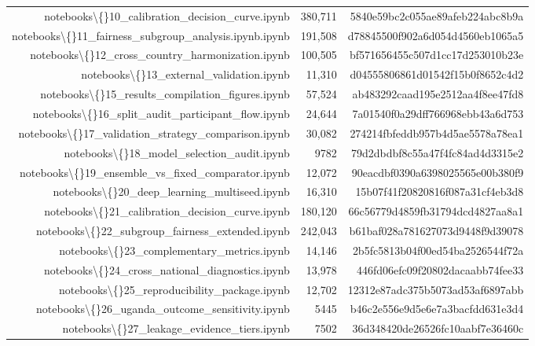 \documentclass[10pt]{article}
\begin{document}
\begin{longtable}{rrr}
notebooks\textbackslash\{\}10\_calibration\_decision\_curve.ipynb & 380{,}711 & 5840e59bc2c055ae89afeb224abc8b9a \\
notebooks\textbackslash\{\}11\_fairness\_subgroup\_analysis.ipynb.ipynb & 191{,}508 & d78845500f902a6d054d4560eb1065a5 \\
notebooks\textbackslash\{\}12\_cross\_country\_harmonization.ipynb & 100{,}505 & bf571656455c507d1cc17d253010b23e \\
notebooks\textbackslash\{\}13\_external\_validation.ipynb & 11{,}310 & d04555806861d01542f15b0f8652c4d2 \\
notebooks\textbackslash\{\}15\_results\_compilation\_figures.ipynb & 57{,}524 & ab483292caad195e2512aa4f8ee47fd8 \\
notebooks\textbackslash\{\}16\_split\_audit\_participant\_flow.ipynb & 24{,}644 & 7a01540f0a29dff766968ebb43a6d753 \\
notebooks\textbackslash\{\}17\_validation\_strategy\_comparison.ipynb & 30{,}082 & 274214fbfeddb957b4d5ae5578a78ea1 \\
notebooks\textbackslash\{\}18\_model\_selection\_audit.ipynb & 9782 & 79d2dbdbf8c55a47f4fc84ad4d3315e2 \\
notebooks\textbackslash\{\}19\_ensemble\_vs\_fixed\_comparator.ipynb & 12{,}072 & 90eacdbf0390a6398025565e00b380f9 \\
notebooks\textbackslash\{\}20\_deep\_learning\_multiseed.ipynb & 16{,}310 & 15b07f41f20820816f087a31cf4eb3d8 \\
notebooks\textbackslash\{\}21\_calibration\_decision\_curve.ipynb & 180{,}120 & 66c56779d4859fb31794dcd4827aa8a1 \\
notebooks\textbackslash\{\}22\_subgroup\_fairness\_extended.ipynb & 242{,}043 & b61baf028a781627073d9448f9d39078 \\
notebooks\textbackslash\{\}23\_complementary\_metrics.ipynb & 14{,}146 & 2b5fc5813b04f00ed54ba2526544f72a \\
notebooks\textbackslash\{\}24\_cross\_national\_diagnostics.ipynb & 13{,}978 & 446fd06efc09f20802dacaabb74fee33 \\
notebooks\textbackslash\{\}25\_reproducibility\_package.ipynb & 12{,}702 & 12312e87adc375b5073ad53af6897abb \\
notebooks\textbackslash\{\}26\_uganda\_outcome\_sensitivity.ipynb & 5445 & b46c2e556e9d5e6e7a3bacfdd631e3d4 \\
notebooks\textbackslash\{\}27\_leakage\_evidence\_tiers.ipynb & 7502 & 36d348420de26526fc10aabf7e36460c \\

\end{longtable}
\end{document}
